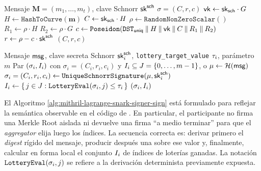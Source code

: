 \begin{algorithm}[ht]
	\caption{\UniqueSchnorrSignature en la era \Lagrange}
	\label{alg:mithril-lagrange-unique-schnorr-sign}
	\begin{algorithmic}[1]
		\Require Mensaje $\mathbf{M} = (m_1,\ldots,m_t)$, clave Schnorr $\mathsf{sk}^{\mathsf{sch}}$
		\Ensure $\sigma = (C, r, c)$
		\State $\mathsf{vk} \gets \mathsf{sk}_{\mathsf{sch}} \cdot G$
		\State $H \gets \texttt{HashToCurve}(\mathbf{m})$
		\State $C \gets \mathsf{sk}_{\mathsf{sch}} \cdot H$ \Comment{\CommitmentPoint}
		\State $\rho \gets \texttt{RandomNonZeroScalar}()$
		\State $R_1 \gets \rho \cdot H$
		\State $R_2 \gets \rho \cdot G$
		\State $c \gets \texttt{Poseidon}(\texttt{DST}_{\mathsf{uniq}} \mathbin{\|} H \mathbin{\|} \mathsf{vk} \mathbin{\|} C \mathbin{\|} R_1 \mathbin{\|} R_2)$
		\State $r \gets \rho - c \cdot \mathsf{sk}^{\mathsf{sch}}$
		\State \Return $(C, r, c)$
	\end{algorithmic}
\end{algorithm}

\begin{algorithm}[ht]
	\caption{Firma de un participante con chequeo de lotería en \Lagrange}
	\label{alg:mithril-lagrange-snark-signer-sign}
	\begin{algorithmic}[1]
		\Require Mensaje $\mathsf{msg}$, clave secreta Schnorr $\mathsf{sk}^{\mathsf{sch}}_i$, \texttt{lottery\_target\_value} $\tau_i$, parámetro $m$
		\Ensure Par $(\sigma_i, I_i)$ con $\sigma_i = (C_i,r_i,c_i)$ y $I_i \subseteq J=\{0,\ldots,m-1\}$, o \LotteryLost
		\State $\mu \gets \mathcal{H}(\mathsf{msg})$ \Comment{\ProtocolMessageComputeHash}
		\State $\sigma_i = (C_i, r_i, c_i) \gets \texttt{UniqueSchnorrSignature}(\mu,\mathsf{sk}^{\mathsf{sch}}_i)$
		\State $I_i \gets \{\, j \in J : \texttt{LotteryEval}(\sigma_i, j) \leq \tau_i \,\}$
			\State \Return \LotteryLost
		\Else
			\State \Return $(\sigma_i, I_i)$
		\EndIf
	\end{algorithmic}
\end{algorithm}

El Algoritmo \ref{alg:mithril-lagrange-snark-signer-sign} está formulado para reflejar la semántica observable en el código de \Mithril. En particular, el participante no firma una Merkle Root aislada ni devuelve una firma ``a medio terminar'' para que el \textit{aggregator} elija luego los índices. La secuencia correcta es: derivar primero el \textit{digest} rígido \RigidDigest del mensaje, producir después una \UniqueSchnorrSignature sobre ese valor y, finalmente, calcular en forma local el conjunto $I_i$ de índices de loterías ganadas. La notación \(\texttt{LotteryEval}(\sigma_i, j)\) se refiere a la derivación determinista previamente expuesta.

